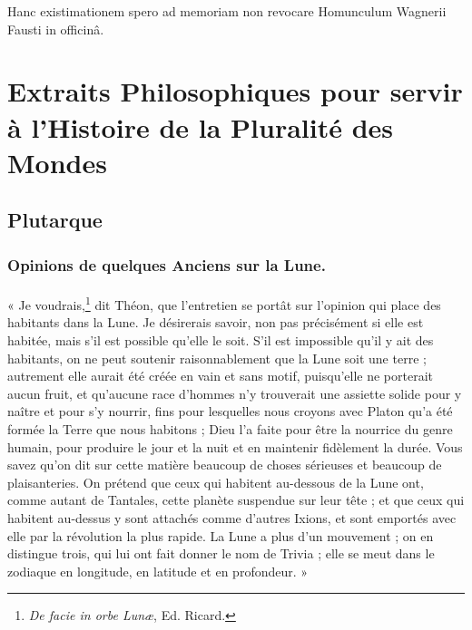 \documentclass[a4paper, 11pt, oneside]{article}
\begin{document}
Hanc existimationem spero ad memoriam non revocare Homunculum Wagnerii Fausti in officinâ.
\clearpage
\section{Extraits Philosophiques pour servir à l'Histoire de la Pluralité des Mondes}
\subsection{Plutarque}
\subsubsection{Opinions de quelques Anciens sur la Lune.}
\paragraph{}
« Je voudrais,\footnote{\emph{De facie in orbe Lunæ}, Ed. Ricard.} dit Théon, que l'entretien se portât sur l'opinion qui place des habitants dans la Lune. Je désirerais savoir, non pas précisément si elle est habitée, mais s'il est possible qu'elle le soit. S'il est impossible qu'il y ait des habitants, on ne peut soutenir raisonnablement que la Lune soit une terre ; autrement elle aurait été créée en vain et sans motif, puisqu'elle ne porterait aucun fruit, et qu'aucune race d'hommes n'y trouverait une assiette solide pour y naître et pour s'y nourrir, fins pour lesquelles nous croyons avec Platon qu'a été formée la Terre que nous habitons ; Dieu l'a faite pour être la nourrice du genre humain, pour produire le jour et la nuit et en maintenir fidèlement la durée. Vous savez qu'on dit sur cette matière beaucoup de choses sérieuses et beaucoup de plaisanteries. On prétend que ceux qui habitent au-dessous de la Lune ont, comme autant de Tantales, cette planète suspendue sur leur tête ; et que ceux qui habitent au-dessus y sont attachés comme d'autres Ixions, et sont emportés avec elle par la révolution la plus rapide. La Lune a plus d'un mouvement ; on en distingue trois, qui lui ont fait donner le nom de Trivia ; elle se meut dans le zodiaque en longitude, en latitude et en profondeur. »
\end{document}
